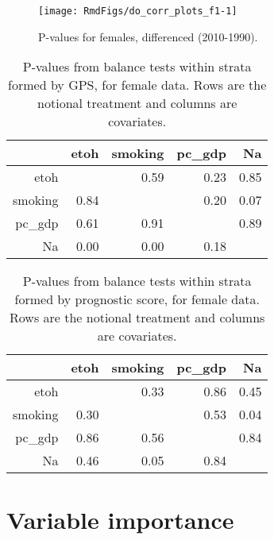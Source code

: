 \documentclass[11pt]{article}\usepackage[]{graphicx}\usepackage[]{color}
\makeatletter
\def\maxwidth{ %
  \ifdim\Gin@nat@width>\linewidth
    \linewidth
  \else
    \Gin@nat@width
  \fi
}
\newenvironment{knitrout}{}{} %
\makeatother
\begin{document}
\begin{knitrout}
\color{fgcolor}\begin{figure}
\texttt{[image: RmdFigs/do\_corr\_plots\_f1-1]} \caption[P-values for females, differenced (2010-1990)]{P-values for females, differenced (2010-1990).}\label{fig:do_corr_plots_f1}
\end{figure}


\end{knitrout}
\begin{table}[ht]
\centering
\begin{tabular}{r|rrrr}
  \hline
 & etoh & smoking & pc\_gdp & Na \\ 
  \hline
etoh &  & 0.59 & 0.23 & 0.85 \\ 
  smoking & 0.84 &  & 0.20 & 0.07 \\ 
  pc\_gdp & 0.61 & 0.91 &  & 0.89 \\ 
  Na & 0.00 & 0.00 & 0.18 &  \\ 
   \hline
\end{tabular}
\caption{P-values from balance tests within strata formed by GPS, for female data.
                    Rows are the notional treatment and columns are covariates.} 
\label{tab:gps_balance_f}
\end{table}
\begin{table}[ht]
\centering
\begin{tabular}{r|rrrr}
  \hline
 & etoh & smoking & pc\_gdp & Na \\ 
  \hline
etoh &  & 0.33 & 0.86 & 0.45 \\ 
  smoking & 0.30 &  & 0.53 & 0.04 \\ 
  pc\_gdp & 0.86 & 0.56 &  & 0.84 \\ 
  Na & 0.46 & 0.05 & 0.84 &  \\ 
   \hline
\end{tabular}
\caption{P-values from balance tests within strata formed by prognostic score, for female data.
                    Rows are the notional treatment and columns are covariates.} 
\label{tab:gps_balance_f}
\end{table}



\clearpage
\section{Variable importance}
\end{document}
